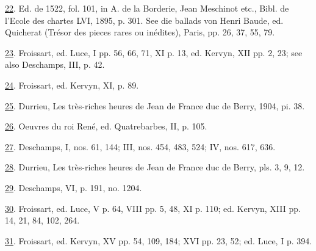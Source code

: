 \protect\hypertarget{23_NOTES.xhtmlux5cux23id_267}{\protect\hyperlink{21_Chapter_Thirteen__IMAGE_AND_WORD.xhtmlux5cux23id_266}{22}}.
Ed. de 1522, fol. 101, in A. de la Borderie, Jean Meschinot etc., Bibl.
de l'Ecole des chartes LVI, 1895, p. 301. See die ballads von Henri
Baude, ed. Quicherat (Trésor des pieces rares ou inédites), Paris, pp.
26, 37, 55, 79.

\protect\hypertarget{23_NOTES.xhtmlux5cux23id_265}{\protect\hyperlink{21_Chapter_Thirteen__IMAGE_AND_WORD.xhtmlux5cux23id_264}{23}}.
Froissart, ed. Luce, I pp. 56, 66, 71, XI p. 13, ed. Kervyn, XII pp. 2,
23; see also Deschamps, III, p. 42.

\protect\hypertarget{23_NOTES.xhtmlux5cux23id_263}{\protect\hyperlink{21_Chapter_Thirteen__IMAGE_AND_WORD.xhtmlux5cux23id_262}{24}}.
Froissart, ed. Kervyn, XI, p. 89.

\protect\hypertarget{23_NOTES.xhtmlux5cux23id_261}{\protect\hyperlink{21_Chapter_Thirteen__IMAGE_AND_WORD.xhtmlux5cux23id_260}{25}}.
Durrieu, Les très-riches heures de Jean de France duc de Berry, 1904,
pi. 38.

\protect\hypertarget{23_NOTES.xhtmlux5cux23id_259}{\protect\hyperlink{21_Chapter_Thirteen__IMAGE_AND_WORD.xhtmlux5cux23id_258}{26}}.
Oeuvres du roi René, ed. Quatrebarbes, II, p. 105.

\protect\hypertarget{23_NOTES.xhtmlux5cux23id_257}{\protect\hyperlink{21_Chapter_Thirteen__IMAGE_AND_WORD.xhtmlux5cux23id_256}{27}}.
Deschamps, I, nos. 61, 144; III, nos. 454, 483, 524; IV, nos. 617, 636.

\protect\hypertarget{23_NOTES.xhtmlux5cux23id_255}{\protect\hyperlink{21_Chapter_Thirteen__IMAGE_AND_WORD.xhtmlux5cux23id_254}{28}}.
Durrieu, Les très-riches heures de Jean de France duc de Berry, pls. 3,
9, 12.

\protect\hypertarget{23_NOTES.xhtmlux5cux23id_253}{\protect\hyperlink{21_Chapter_Thirteen__IMAGE_AND_WORD.xhtmlux5cux23id_252}{29}}.
Deschamps, VI, p. 191, no. 1204.

\protect\hypertarget{23_NOTES.xhtmlux5cux23id_251}{\protect\hyperlink{21_Chapter_Thirteen__IMAGE_AND_WORD.xhtmlux5cux23id_250}{30}}.
Froissart, ed. Luce, V p. 64, VIII pp. 5, 48, XI p. 110; ed. Kervyn,
XIII pp. 14, 21, 84, 102, 264.

\protect\hypertarget{23_NOTES.xhtmlux5cux23id_249}{\protect\hyperlink{21_Chapter_Thirteen__IMAGE_AND_WORD.xhtmlux5cux23id_248}{31}}.
Froissart, ed. Kervyn, XV pp. 54, 109, 184; XVI pp. 23, 52; ed. Luce, I
p. 394.


